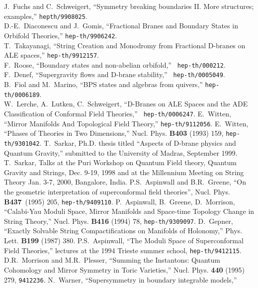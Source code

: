 \documentclass[a4paper,12pt]{article}
\begin{document}
\begin{thebibliography}{99}
J.~Fuchs and C.~Schweigert, ``Symmetry breaking
boundaries II. More structures; examples,'' {\tt hepth/9908025}. \\
D.-E.~Diaconescu and J.~Gomis, ``Fractional Branes and
Boundary States in Orbifold Theories,'' {\tt hep-th/9906242}. \\
T.~Takayanagi, ``String Creation and Monodromy from Fractional D-branes
on ALE spaces,'' {\tt hep-th/9912157}.\\
F.~Roose, ``Boundary states and non-abelian orbifold,'' {\tt
hep-th/000212}.\\
F.~Denef, ``Supergravity flows and D-brane stability,'' {\tt
hep-th/0005049}. \\
B.~Fiol and M.~Marino, ``BPS states and algebras from quivers,''
{\tt hep-th/0006189}. \\
W.~Lerche, A.~Lutken, C.~Schweigert, ``D-Branes on ALE Spaces and the
ADE Classification of Conformal Field Theories,'' {\tt
hep-th/0006247}. 
 E.~Witten, ``Mirror Manifolds And Topological Field
Theory,'' {\tt hep-th/9112056}.
E.~Witten, ``Phases of \coordHE{} Theories in Two Dimensions,''
Nucl. Phys. {\bf B403} (1993) 159, {\tt hep-th/9301042}.
 T.~Sarkar, Ph.D. thesis titled ``Aspects of D-brane
physics and Quantum Gravity,'' submitted to the University
of Madras, September 1999.
 T.~Sarkar, Talks  at the Puri Workshop on Quantum Field
theory, Quantum Gravity and Strings, Dec. 9-19, 1998 and at the
Millennium Meeting on String Theory Jan. 3-7, 2000, Bangalore, India.
P.S.~Aspinwall and B.R.~Greene, ``On the geometric interpretation
of \coordHE{} superconformal field theories'', Nucl. Phys. {\bf B437}\
(1995) 205, {\tt hep-th/9409110}.
P.~Aspinwall, B.~Greene, D.~Morrison, 
``Calabi-Yau Moduli Space, Mirror Manifolds and Space-time Topology
Change in String Theory,'' 
Nucl. Phys. {\bf B416} (1994) 78, {\tt hep-th/9309097}.
D.~Gepner, ``Exactly Solvable String Compactifications on
Manifolds of \coordHE{} Holonomy,'' Phys. Lett. {\bf B199}
(1987) 380.
P.S.~Aspinwall, ``The Moduli Space of \coordHE{} Superconformal
Field Theories,'' lectures at the 1994 Trieste summer school,
{\tt hep-th/9412115}.
D.R.~Morrison and M.R.~Plesser, ``Summing the Instantons:
Quantum Cohomology and Mirror Symmetry in Toric
Varieties,'' Nucl. Phys. {\bf 440} (1995) 279,
{\tt 9412236}.
N.~Warner, ``Supersymmetry in boundary integrable models,''

\end{thebibliography}
\end{document}
